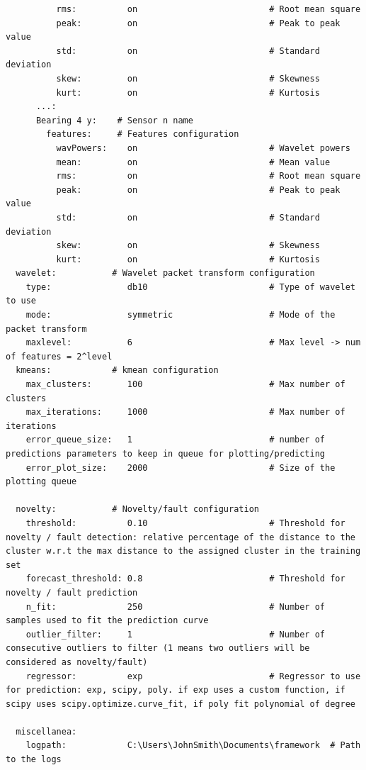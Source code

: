 \begin{verbatim}
          rms:          on                          # Root mean square
          peak:         on                          # Peak to peak value
          std:          on                          # Standard deviation
          skew:         on                          # Skewness
          kurt:         on                          # Kurtosis
      ...:
      Bearing 4 y:    # Sensor n name
        features:     # Features configuration
          wavPowers:    on                          # Wavelet powers
          mean:         on                          # Mean value
          rms:          on                          # Root mean square
          peak:         on                          # Peak to peak value
          std:          on                          # Standard deviation
          skew:         on                          # Skewness
          kurt:         on                          # Kurtosis
  wavelet:           # Wavelet packet transform configuration
    type:               db10                        # Type of wavelet to use
    mode:               symmetric                   # Mode of the packet transform
    maxlevel:           6                           # Max level -> num of features = 2^level
  kmeans:            # kmean configuration
    max_clusters:       100                         # Max number of clusters
    max_iterations:     1000                        # Max number of iterations
    error_queue_size:   1                           # number of predictions parameters to keep in queue for plotting/predicting
    error_plot_size:    2000                        # Size of the plotting queue
  
  novelty:           # Novelty/fault configuration
    threshold:          0.10                        # Threshold for novelty / fault detection: relative percentage of the distance to the cluster w.r.t the max distance to the assigned cluster in the training set
    forecast_threshold: 0.8                         # Threshold for novelty / fault prediction
    n_fit:              250                         # Number of samples used to fit the prediction curve
    outlier_filter:     1                           # Number of consecutive outliers to filter (1 means two outliers will be considered as novelty/fault)
    regressor:          exp                         # Regressor to use for prediction: exp, scipy, poly. if exp uses a custom function, if scipy uses scipy.optimize.curve_fit, if poly fit polynomial of degree
  
  miscellanea:
    logpath:            C:\Users\JohnSmith\Documents\framework  # Path to the logs
\end{verbatim}


